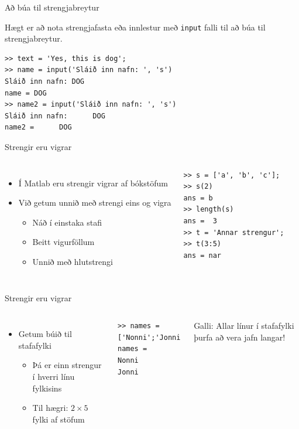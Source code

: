 \documentclass[handout]{beamer}
\begin{document}
\begin{frame}[fragile]{Að búa til strengjabreytur}

Hægt er að nota strengjafasta eða innlestur með \texttt{input} falli til að búa til strengjabreytur.  
\begin{verbatim}
>> text = 'Yes, this is dog';
>> name = input('Sláið inn nafn: ', 's')
Sláið inn nafn: DOG
name = DOG
>> name2 = input('Sláið inn nafn: ', 's')
Sláið inn nafn:      DOG
name2 =      DOG
\end{verbatim}
\end{frame}

\begin{frame}[fragile]{Strengir eru vigrar}
\begin{columns}
\begin{itemize}
 \item Í Matlab eru strengir vigrar af bókstöfum
 \item Við getum unnið með strengi eins og vigra
 \begin{itemize}
  \item Náð í einstaka stafi
  \item Beitt vigurföllum
  \item Unnið með hlutstrengi
 \end{itemize}

\end{itemize}
\pause
{}
\begin{verbatim}
>> s = ['a', 'b', 'c'];
>> s(2)
ans = b
>> length(s)
ans =  3
>> t = 'Annar strengur';
>> t(3:5)
ans = nar
\end{verbatim}
\end{columns}
\end{frame}

\begin{frame}[fragile]{Strengir eru vigrar}
\begin{columns}
\begin{itemize}
 \item Getum búið til stafafylki
 \begin{itemize}
  \item Þá er einn strengur í hverri línu fylkisins
  \item Til hægri: $2 \times 5$ fylki af stöfum
 \end{itemize}
\end{itemize}

\begin{verbatim}
>> names = ['Nonni';'Jonni']
names =
Nonni
Jonni
\end{verbatim}
\pause
Galli: Allar línur í stafafylki þurfa að vera jafn langar!
\end{columns}
\end{frame}
\end{document}
